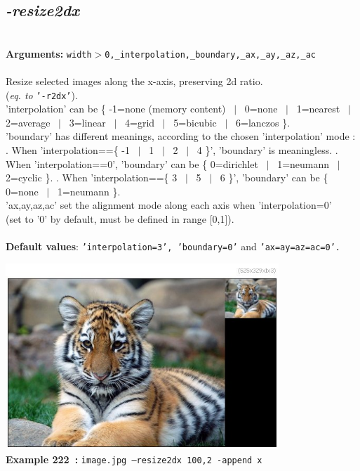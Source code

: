 \documentclass[a4paper,11pt,twoside]{book}
\begin{document}
\subsection{\emph{-resize2dx} }\vspace*{-0.5em}
~\\\textbf{Arguments: } 
{\small \texttt{width$>$0,\_interpolation,\_boundary,\_ax,\_ay,\_az,\_ac}}\\~\\
Resize selected images along the x-axis, preserving 2d ratio.
~\\(\emph{eq. to} {\small \texttt{'-r2dx'}}).
~\\'interpolation' can be \{ -1=none (memory content) ~$|$~ 0=none ~$|$~ 1=nearest ~$|$~ 2=average ~$|$~ 3=linear ~$|$~ 4=grid ~$|$~ 5=bicubic ~$|$~ 6=lanczos \}.
~\\'boundary' has different meanings, according to the chosen 'interpolation' mode :
. When 'interpolation==\{ -1 ~$|$~ 1 ~$|$~ 2 ~$|$~ 4 \}', 'boundary' is meaningless.
. When 'interpolation==0', 'boundary' can be \{ 0=dirichlet ~$|$~ 1=neumann ~$|$~ 2=cyclic \}.
. When 'interpolation==\{ 3 ~$|$~ 5 ~$|$~ 6 \}', 'boundary' can be \{ 0=none ~$|$~ 1=neumann \}.
~\\'ax,ay,az,ac' set the alignment mode along each axis when 'interpolation=0'
~\\(set to '0' by default, must be defined in range [0,1]).
~\\~\\\textbf{Default values}: {\small \texttt{'interpolation=3', 'boundary=0'} and \texttt{'ax=ay=az=ac=0'.}}
\begin{center}\includegraphics[keepaspectratio=true,height=7cm,width=\textwidth]{img/gmic_def222.jpg}\\
{\footnotesize \textbf{Example 222~:} \texttt{image.jpg --resize2dx 100,2 -append x}}
\end{center}
\end{document}

